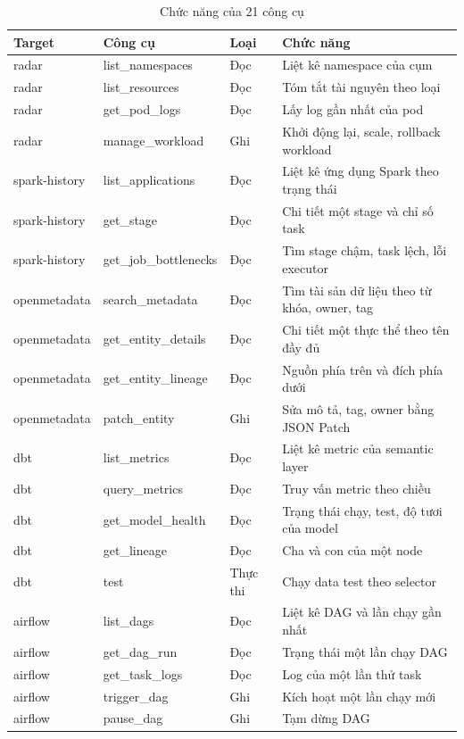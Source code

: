\documentclass[a4paper]{article}
\begin{document}
\begin{table}[H]\centering\caption{Chức năng của 21 công cụ}\label{tab:toolfunc}
{\singlespacing\renewcommand{\arraystretch}{1.35}\small
\begin{tabularx}{\textwidth}{|p{2.4cm}|p{3.8cm}|>{\centering\arraybackslash}p{1.5cm}|X|}\hline
\textbf{Target} & \textbf{Công cụ} & \textbf{Loại} & \textbf{Chức năng} \\ \hline
radar & list\_namespaces & Đọc & Liệt kê namespace của cụm \\ \hline
radar & list\_resources & Đọc & Tóm tắt tài nguyên theo loại \\ \hline
radar & get\_pod\_logs & Đọc & Lấy log gần nhất của pod \\ \hline
radar & manage\_workload & Ghi & Khởi động lại, scale, rollback workload \\ \hline
spark-history & list\_applications & Đọc & Liệt kê ứng dụng Spark theo trạng thái \\ \hline
spark-history & get\_stage & Đọc & Chi tiết một stage và chỉ số task \\ \hline
spark-history & get\_job\_bottlenecks & Đọc & Tìm stage chậm, task lệch, lỗi executor \\ \hline
openmetadata & search\_metadata & Đọc & Tìm tài sản dữ liệu theo từ khóa, owner, tag \\ \hline
openmetadata & get\_entity\_details & Đọc & Chi tiết một thực thể theo tên đầy đủ \\ \hline
openmetadata & get\_entity\_lineage & Đọc & Nguồn phía trên và đích phía dưới \\ \hline
openmetadata & patch\_entity & Ghi & Sửa mô tả, tag, owner bằng JSON Patch \\ \hline
dbt & list\_metrics & Đọc & Liệt kê metric của semantic layer \\ \hline
dbt & query\_metrics & Đọc & Truy vấn metric theo chiều \\ \hline
dbt & get\_model\_health & Đọc & Trạng thái chạy, test, độ tươi của model \\ \hline
dbt & get\_lineage & Đọc & Cha và con của một node \\ \hline
dbt & test & Thực thi & Chạy data test theo selector \\ \hline
airflow & list\_dags & Đọc & Liệt kê DAG và lần chạy gần nhất \\ \hline
airflow & get\_dag\_run & Đọc & Trạng thái một lần chạy DAG \\ \hline
airflow & get\_task\_logs & Đọc & Log của một lần thử task \\ \hline
airflow & trigger\_dag & Ghi & Kích hoạt một lần chạy mới \\ \hline
airflow & pause\_dag & Ghi & Tạm dừng DAG \\ \hline
\end{tabularx}}\end{table}
\end{document}
